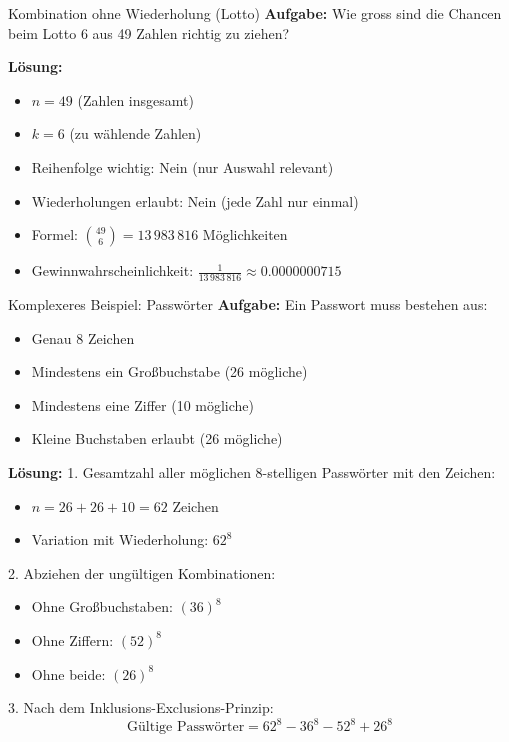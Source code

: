 \begin{example}{Kombination ohne Wiederholung (Lotto)}
\textbf{Aufgabe:} Wie gross sind die Chancen beim Lotto 6 aus 49 Zahlen richtig zu ziehen?

\textbf{Lösung:}
\begin{itemize}
\item $n = 49$ (Zahlen insgesamt)
\item $k = 6$ (zu wählende Zahlen)
\item Reihenfolge wichtig: Nein (nur Auswahl relevant)
\item Wiederholungen erlaubt: Nein (jede Zahl nur einmal)
\item Formel: $\binom{49}{6} = 13\,983\,816$ Möglichkeiten
\item Gewinnwahrscheinlichkeit: $\frac{1}{13\,983\,816} \approx 0.0000000715$
\end{itemize}
\end{example}

\begin{example}{Komplexeres Beispiel: Passwörter}
\textbf{Aufgabe:} Ein Passwort muss bestehen aus:
\begin{itemize}
\item Genau 8 Zeichen
\item Mindestens ein Großbuchstabe (26 mögliche)
\item Mindestens eine Ziffer (10 mögliche)
\item Kleine Buchstaben erlaubt (26 mögliche)
\end{itemize}

\textbf{Lösung:}
1. Gesamtzahl aller möglichen 8-stelligen Passwörter mit den Zeichen:
   \begin{itemize}
   \item $n = 26 + 26 + 10 = 62$ Zeichen
   \item Variation mit Wiederholung: $62^8$
   \end{itemize}

2. Abziehen der ungültigen Kombinationen:
   \begin{itemize}
   \item Ohne Großbuchstaben: $(36)^8$
   \item Ohne Ziffern: $(52)^8$
   \item Ohne beide: $(26)^8$
   \end{itemize}

3. Nach dem Inklusions-Exclusions-Prinzip:
   \[ \text{Gültige Passwörter} = 62^8 - 36^8 - 52^8 + 26^8 \]
\end{example}

